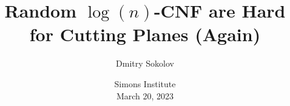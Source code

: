 

\titlegraphic{
    
}


\title[]{
    Random $\log(n)$-CNF are Hard for Cutting Planes (Again)
}

\author{
    Dmitry Sokolov
}  


\date{Simons Institute\\ March 20, 2023}






    \maketitle

    
    
    

